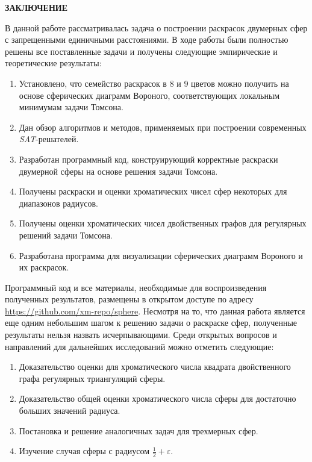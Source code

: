 \newpage
\begin{center}
\noindent\textbf{ЗАКЛЮЧЕНИЕ}\label{chapters:conclusions}
\vspace{1.5mm}
\end{center}

В данной работе рассматривалась задача о построении раскрасок двумерных сфер с запрещенными единичными расстояниями. 
В ходе работы были полностью решены все поставленные задачи и получены следующие эмпирические и теоретические результаты:

\begin{enumerate}

\item Установлено, что семейство раскрасок в $8$ и $9$ цветов можно получить на основе сферических диаграмм Вороного, соответствующих локальным минимумам задачи Томсона.  

\item Дан обзор алгоритмов и методов, применяемых при построении современных \textit{SAT}-решателей.

\item Разработан программный код, конструирующий корректные раскраски двумерной сферы на основе решения задачи Томсона.

\item Получены раскраски и оценки хроматических чисел сфер некоторых для диапазонов радиусов.

\item Получены оценки хроматических чисел двойственных графов для регулярных решений задачи Томсона.

\item Разработана программа для визуализации сферических диаграмм Вороного и их раскрасок.

\end{enumerate}

Программный код и все материалы, необходимые для воспроизведения полученных результатов, размещены в открытом доступе по адресу
\url{https://github.com/xm-repo/sphere}.
Несмотря на то, что данная работа является еще одним небольшим шагом к решению задачи о раскраске сфер, полученные результаты нельзя назвать исчерпывающими. Среди открытых вопросов и направлений для дальнейших исследований можно отметить следующие:

\begin{enumerate}

\item Доказательство оценки для хроматического числа квадрата двойственного графа регулярных триангуляций сферы.
\item Доказательство общей оценки хроматического числа сферы для достаточно больших значений радиуса.
\item Постановка и решение аналогичных задач для трехмерных сфер.
\item Изучение случая сферы с радиусом $\frac{1}{2}+\varepsilon$.

\end{enumerate}
